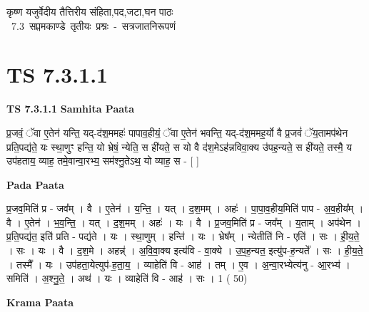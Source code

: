 \documentclass[17pt]{extarticle}
\begin{document}
\begin{titlepage}
    \begin{center}
 
\begin{sanskrit}
    { \Large
    कृष्ण यजुर्वेदीय तैत्तिरीय संहिता,पद,जटा,घन पाठः 
    }
    \\
    \vspace{2.5cm}
    \mbox{ \Large
    7.3      सप्तमकाण्डे तृतीयः प्रश्नः - सत्रजातनिरूपणं   }
\end{sanskrit}
\end{center}

\end{titlepage}
\tableofcontents
{}
\pagebreak


\section{ TS 7.3.1.1 }

\textbf{TS 7.3.1.1 } \newline
\textbf{Samhita Paata} \newline

प्र॒जवं॒ ॅवा ए॒तेन॑ यन्ति॒ यद्-द॑श॒ममहः॑ पापाव॒हीयं॒ ॅवा ए॒तेन॑ भवन्ति॒ यद्-द॑श॒ममह॒र्यो वै प्र॒जवं॑ ॅय॒तामप॑थेन प्रति॒पद्य॑ते॒ यः स्था॒णुꣳ हन्ति॒ यो भ्रेषं॒ न्येति॒ स ही॑यते॒ स यो वै द॑श॒मेऽह॑न्नविवा॒क्य उ॑पह॒न्यते॒ स ही॑यते॒ तस्मै॒ य उप॑हताय॒ व्याह॒ तमे॒वान्वा॒रभ्य॒ सम॑श्नु॒तेऽथ॒ यो व्याह॒ स - [  ] \newline

\textbf{Pada Paata} \newline

प्र॒जव॒मिति॑ प्र - जव᳚म् । वै । ए॒तेन॑ । य॒न्ति॒ । यत् । द॒श॒मम् । अहः॑ । पा॒पा॒व॒हीय॒मिति॑ पाप - अ॒व॒हीय᳚म् । वै । ए॒तेन॑ । भ॒व॒न्ति॒ । यत् । द॒श॒मम् । अहः॑ । यः । वै । प्र॒जव॒मिति॑ प्र - जव᳚म् । य॒ताम् । अप॑थेन । प्र॒ति॒पद्य॑त॒ इति॑ प्रति - पद्य॑ते । यः । स्था॒णुम् । हन्ति॑ । यः । भ्रेष᳚म् । न्येतीति॑ नि - एति॑ । सः । ही॒य॒ते॒ । सः । यः । वै । द॒श॒मे । अहन्न्॑ । अ॒वि॒वा॒क्य इत्य॑वि - वा॒क्ये । उ॒प॒ह॒न्यत॒ इत्यु॑प-ह॒न्यते᳚ । सः । ही॒य॒ते॒ । तस्मै᳚ । यः । उप॑हता॒येत्युप॑-ह॒ता॒य॒ । व्याहेति॑ वि - आह॑ । तम् । ए॒व । अ॒न्वा॒रभ्येत्य॑नु - आ॒रभ्य॑ । समिति॑ । अ॒श्नु॒ते॒ । अथ॑ । यः । व्याहेति॑ वि - आह॑ । सः । 1 ( 50)  \newline


\textbf{Krama Paata} \newline
\end{document}

